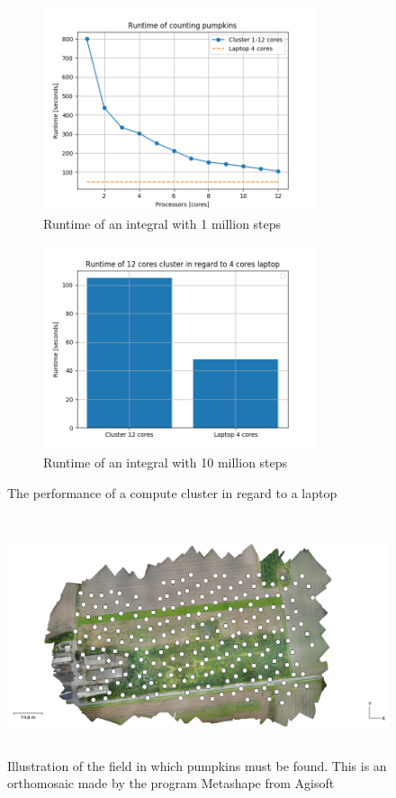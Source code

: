 \documentclass[../Head/Report.tex]{subfiles}
\begin{document}
\begin{figure}[H]
\centering
  \begin{subfigure}[b]{0.48\textwidth}
  \centering
    \includegraphics[height=6cm]{../Figures/runtime_counting_pumpkins1.png}
    \caption{Runtime of an integral with 1 million steps}
    \label{fig:counting_pumpkins_plot}
  \end{subfigure}
  \hfill
  \begin{subfigure}[b]{0.48\textwidth}
  \centering
    \includegraphics[height=6cm]{../Figures/barchart_pumpkin_runtime.png}
    \caption{Runtime of an integral with 10 million steps}
    \label{fig:counting_pumpkins_barchart}
  \end{subfigure}
  \caption{The performance of a compute cluster in regard to a laptop}
  \label{fig:counting_pumpkins}
\end{figure}  

\begin{figure}[H]
	\centering
	\captionsetup{justification=centering}
	\includegraphics[height=7cm]{../Figures/orthomosaic.png}
    \caption{Illustration of the field in which pumpkins must be found. This is an orthomosaic made by the program Metashape from Agisoft}
    \label{fig:orthomosaic}
\end{figure}
\end{document}
